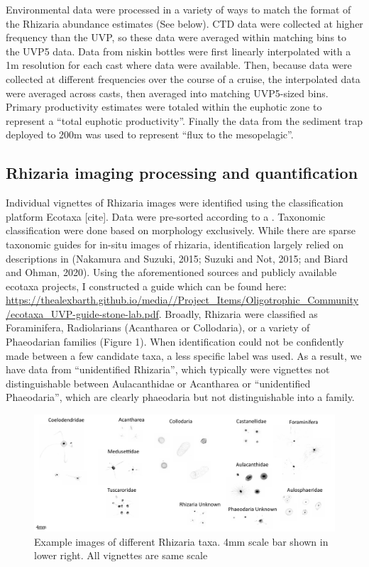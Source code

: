 \documentclass[
]{article}
\begin{document}
Environmental data were processed in a variety of ways to match the
format of the Rhizaria abundance estimates (See below). CTD data were
collected at higher frequency than the UVP, so these data were averaged
within matching bins to the UVP5 data. Data from niskin bottles were
first linearly interpolated with a 1m resolution for each cast where
data were available. Then, because data were collected at different
frequencies over the course of a cruise, the interpolated data were
averaged across casts, then averaged into matching UVP5-sized bins.
Primary productivity estimates were totaled within the euphotic zone to
represent a ``total euphotic productivity''. Finally the data from the
sediment trap deployed to 200m was used to represent ``flux to the
mesopelagic''.

\hypertarget{rhizaria-imaging-processing-and-quantification}{%
\subsection{Rhizaria imaging processing and
quantification}\label{rhizaria-imaging-processing-and-quantification}}

Individual vignettes of Rhizaria images were identified using the
classification platform Ecotaxa {[}cite{]}. Data were pre-sorted
according to a . Taxonomic classification were done based on morphology
exclusively. While there are sparse taxonomic guides for in-situ images
of rhizaria, identification largely relied on descriptions in (Nakamura
and Suzuki, 2015; Suzuki and Not, 2015; and Biard and Ohman, 2020).
Using the aforementioned sources and publicly available ecotaxa
projects, I constructed a guide which can be found here:
\url{https://thealexbarth.github.io/media//Project_Items/Oligotrophic_Community/ecotaxa_UVP-guide-stone-lab.pdf}.
Broadly, Rhizaria were classified as Foraminifera, Radiolarians
(Acantharea or Collodaria), or a variety of Phaeodarian families (Figure
1). When identification could not be confidently made between a few
candidate taxa, a less specific label was used. As a result, we have
data from ``unidentified Rhizaria'', which typically were vignettes not
distinguishable between Aulacanthidae or Acantharea or ``unidentified
Phaeodaria'', which are clearly phaeodaria but not distinguishable into
a family.

\begin{figure}

{\centering \includegraphics{images/01_taxa.pdf}

}

\caption{Example images of different Rhizaria taxa. 4mm scale bar shown
in lower right. All vignettes are same scale}

\end{figure}
\end{document}
